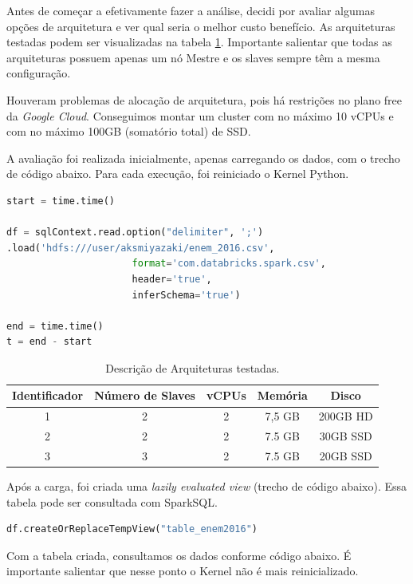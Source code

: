 \documentclass{article}
\begin{document}
Antes de começar a efetivamente fazer a análise, decidi por avaliar algumas opções de arquitetura e ver qual seria o melhor custo benefício. As arquiteturas testadas podem ser visualizadas na tabela \ref{tab:arqs}. Importante salientar que todas as arquiteturas possuem apenas um nó Mestre e os slaves sempre têm a mesma configuração.

Houveram problemas de alocação de arquitetura, pois há restrições no plano free da \emph{Google Cloud}. Conseguimos montar um cluster com no máximo 10 vCPUs e com no máximo 100GB (somatório total) de SSD.

A avaliação foi realizada inicialmente, apenas carregando os dados, com o trecho de código abaixo. Para cada execução, foi reiniciado o Kernel Python.

\begin{lstlisting}[caption= {Carga de dados no Spark},captionpos=b, language=python]
start = time.time()

df = sqlContext.read.option("delimiter", ';')
.load('hdfs:///user/aksmiyazaki/enem_2016.csv', 
                      format='com.databricks.spark.csv', 
                      header='true', 
                      inferSchema='true')

end = time.time()
t = end - start
\end{lstlisting}


\begin{table}[H]
\centering
\begin{tabular}{|c|c|c|c|c|}
\hline
Identificador & Número de Slaves & vCPUs &  Memória & Disco \\ \hline \hline
1 & 2 & 2 & 7,5 GB & 200GB HD \\ \hline
2 & 2 & 2 & 7.5 GB & 30GB SSD \\ \hline
3 & 3 & 2 & 7.5 GB & 20GB SSD\\ \hline
\end{tabular}
\caption{Descrição de Arquiteturas testadas.}
\label{tab:arqs}
\end{table}

Após a carga, foi criada uma \emph{lazily evaluated view} (trecho de código abaixo). Essa tabela pode ser consultada com SparkSQL. 

\begin{lstlisting}[caption= {Criação da Tabela para Consulta},captionpos=b, language=python]
df.createOrReplaceTempView("table_enem2016")
\end{lstlisting}

Com a tabela criada, consultamos os dados conforme código abaixo. É importante salientar que nesse ponto o Kernel não é mais reinicializado.
\end{document}
